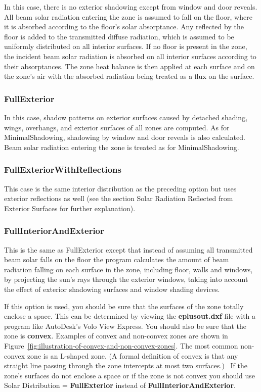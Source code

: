In this case, there is no exterior shadowing except from window and door reveals. All beam solar radiation entering the zone is assumed to fall on the floor, where it is absorbed according to the floor's solar absorptance. Any reflected by the floor is added to the transmitted diffuse radiation, which is assumed to be uniformly distributed on all interior surfaces. If no floor is present in the zone, the incident beam solar radiation is absorbed on all interior surfaces according to their absorptances. The zone heat balance is then applied at each surface and on the zone's air with the absorbed radiation being treated as a flux on the surface.

\subsubsection{FullExterior}\label{fullexterior}

In this case, shadow patterns on exterior surfaces caused by detached shading, wings, overhangs, and exterior surfaces of all zones are computed. As for MinimalShadowing, shadowing by window and door reveals is also calculated. Beam solar radiation entering the zone is treated as for MinimalShadowing.

\subsubsection{FullExteriorWithReflections}\label{fullexteriorwithreflections}

This case is the same interior distribution as the preceding option but uses exterior reflections as well (see the section Solar Radiation Reflected from Exterior Surfaces for further explanation).

\subsubsection{FullInteriorAndExterior}\label{fullinteriorandexterior}

This is the same as FullExterior except that instead of assuming all transmitted beam solar falls on the floor the program calculates the amount of beam radiation falling on each surface in the zone, including floor, walls and windows, by projecting the sun's rays through the exterior windows, taking into account the effect of exterior shadowing surfaces and window shading devices.

If this option is used, you should be sure that the surfaces of the zone totally enclose a space. This can be determined by viewing the \textbf{eplusout.dxf} file with a program like AutoDesk's Volo View Express. You should also be sure that the zone is \textbf{convex}. Examples of convex and non-convex zones are shown in Figure~\ref{fig:illustration-of-convex-and-non-convex-zones}. The most common non-convex zone is an L-shaped zone. (A formal definition of convex is that any straight line passing through the zone intercepts at most two surfaces.)~ If the zone's surfaces do not enclose a space or if the zone is not convex you should use Solar Distribution = \textbf{FullExterior} instead of \textbf{FullInteriorAndExterior}.

